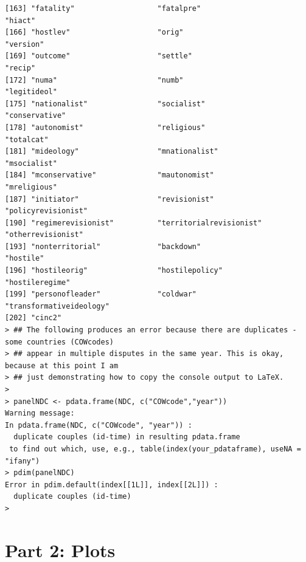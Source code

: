 \documentclass[12pt]{article}
\begin{document}
\begin{verbatim}
[163] "fatality"                   "fatalpre"                   "hiact"                     
[166] "hostlev"                    "orig"                       "version"                   
[169] "outcome"                    "settle"                     "recip"                     
[172] "numa"                       "numb"                       "legitideol"                
[175] "nationalist"                "socialist"                  "conservative"              
[178] "autonomist"                 "religious"                  "totalcat"                  
[181] "mideology"                  "mnationalist"               "msocialist"                
[184] "mconservative"              "mautonomist"                "mreligious"                
[187] "initiator"                  "revisionist"                "policyrevisionist"         
[190] "regimerevisionist"          "territorialrevisionist"     "otherrevisionist"          
[193] "nonterritorial"             "backdown"                   "hostile"                   
[196] "hostileorig"                "hostilepolicy"              "hostileregime"             
[199] "personofleader"             "coldwar"                    "transformativeideology"    
[202] "cinc2"                     
> ## The following produces an error because there are duplicates - some countries (COWcodes) 
> ## appear in multiple disputes in the same year. This is okay, because at this point I am 
> ## just demonstrating how to copy the console output to LaTeX.
> 
> panelNDC <- pdata.frame(NDC, c("COWcode","year"))
Warning message:
In pdata.frame(NDC, c("COWcode", "year")) :
  duplicate couples (id-time) in resulting pdata.frame
 to find out which, use, e.g., table(index(your_pdataframe), useNA = "ifany")
> pdim(panelNDC)
Error in pdim.default(index[[1L]], index[[2L]]) : 
  duplicate couples (id-time)
> 
\end{verbatim}

\pagebreak

\section*{Part 2: Plots}
\end{document}
